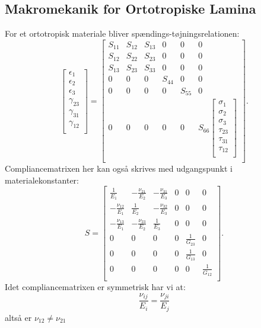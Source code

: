 \subsection{Makromekanik for Ortotropiske Lamina}
For et ortotropisk materiale bliver spændings-tøjningsrelationen:
\begin{equation*}
  \begin{bmatrix}
    \epsilon_1\\
  \epsilon_2\\
  \epsilon_3\\
  \gamma_{23}\\
  \gamma_{31}\\
  \gamma_{12}\\
  \end{bmatrix} = \begin{bmatrix}
    S_{11} & S_{12} & S_{13} & 0 & 0 & 0\\
  S_{12} & S_{22} & S_{23} & 0 & 0 & 0\\
  S_{13} & S_{23} & S_{33} & 0 & 0 & 0\\
  0 & 0 & 0 & S_{44} & 0 & 0\\
  0 & 0 & 0 & 0 & S_{55} & 0\\
  0 & 0 & 0 & 0 & 0 & S_{66} \begin{bmatrix}
    \sigma_1\\
  \sigma_2\\
  \sigma_3\\
  \tau_{23}\\
  \tau_{31}\\
  \tau_{12}\\
  \end{bmatrix}\\
  \end{bmatrix}
.\end{equation*}
Compliancematrixen her kan også skrives med udgangspunkt i materialekonstanter:
\begin{equation*}
  S = \begin{bmatrix}
    \frac{1}{E_1} & - \frac{\nu_{21}}{E_2} & - \frac{\nu_{31}}{E_3} & 0 & 0 & 0\\
  - \frac{\nu_{12}}{E_1} & \frac{1}{E_2} & - \frac{\nu_{32}}{E_3} & 0 & 0 & 0\\
  - \frac{\nu_{13}}{E_1} & - \frac{\nu_{23}}{E_2} & \frac{1}{E_3} & 0 & 0 & 0\\
  0 & 0 & 0 & 0 & \frac{1}{G_{23}} & 0\\
  0 & 0 & 0 & 0 & \frac{1}{G_{13}} & 0\\
  0 & 0 & 0 & 0 & 0 & \frac{1}{G_{12}}\\
  \end{bmatrix}
.\end{equation*}
Idet compliancematrixen er symmetrisk har vi at:
\begin{equation*}
  \frac{\nu_{ij}}{E_i} = \frac{\nu_{ji}}{E_j}
\end{equation*}
altså er $\nu_{12} \neq \nu_{21}$

